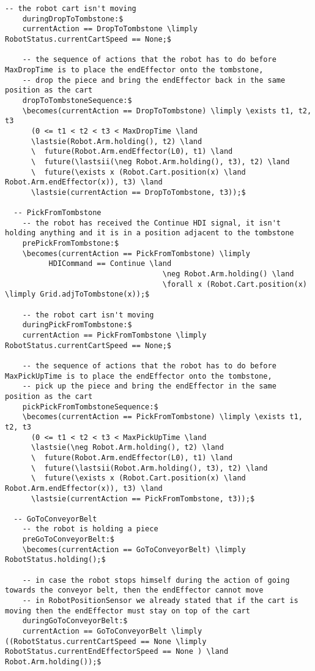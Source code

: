 \begin{lstlisting}[fontadjust, mathescape, frame=single]
    -- the robot cart isn't moving
    duringDropToTombstone:$
    currentAction == DropToTombstone \limply RobotStatus.currentCartSpeed == None;$

    -- the sequence of actions that the robot has to do before MaxDropTime is to place the endEffector onto the tombstone,
    -- drop the piece and bring the endEffector back in the same position as the cart
    dropToTombstoneSequence:$
    \becomes(currentAction == DropToTombstone) \limply \exists t1, t2, t3
      (0 <= t1 < t2 < t3 < MaxDropTime \land
      \lastsie(Robot.Arm.holding(), t2) \land
      \  future(Robot.Arm.endEffector(L0), t1) \land
      \  future(\lastsii(\neg Robot.Arm.holding(), t3), t2) \land
      \  future(\exists x (Robot.Cart.position(x) \land Robot.Arm.endEffector(x)), t3) \land
      \lastsie(currentAction == DropToTombstone, t3));$

  -- PickFromTombstone
    -- the robot has received the Continue HDI signal, it isn't holding anything and it is in a position adjacent to the tombstone
    prePickFromTombstone:$
    \becomes(currentAction == PickFromTombstone) \limply
          HDICommand == Continue \land
                                    \neg Robot.Arm.holding() \land
                                    \forall x (Robot.Cart.position(x) \limply Grid.adjToTombstone(x));$

    -- the robot cart isn't moving
    duringPickFromTombstone:$
    currentAction == PickFromTombstone \limply RobotStatus.currentCartSpeed == None;$

    -- the sequence of actions that the robot has to do before MaxPickUpTime is to place the endEffector onto the tombstone,
    -- pick up the piece and bring the endEffector in the same position as the cart
    pickPickFromTombstoneSequence:$
    \becomes(currentAction == PickFromTombstone) \limply \exists t1, t2, t3
      (0 <= t1 < t2 < t3 < MaxPickUpTime \land
      \lastsie(\neg Robot.Arm.holding(), t2) \land
      \  future(Robot.Arm.endEffector(L0), t1) \land
      \  future(\lastsii(Robot.Arm.holding(), t3), t2) \land
      \  future(\exists x (Robot.Cart.position(x) \land Robot.Arm.endEffector(x)), t3) \land
      \lastsie(currentAction == PickFromTombstone, t3));$
    
  -- GoToConveyorBelt
    -- the robot is holding a piece
    preGoToConveyorBelt:$
    \becomes(currentAction == GoToConveyorBelt) \limply RobotStatus.holding();$
    
    -- in case the robot stops himself during the action of going towards the conveyor belt, then the endEffector cannot move
    -- in RobotPositionSensor we already stated that if the cart is moving then the endEffector must stay on top of the cart
    duringGoToConveyorBelt:$
    currentAction == GoToConveyorBelt \limply ((RobotStatus.currentCartSpeed == None \limply RobotStatus.currentEndEffectorSpeed == None ) \land Robot.Arm.holding());$


\end{lstlisting}
